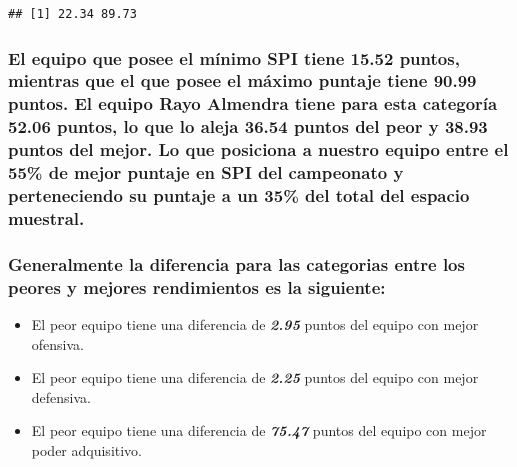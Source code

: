 \documentclass[]{article}
\begin{document}
\begin{verbatim}
## [1] 22.34 89.73
\end{verbatim}

\hypertarget{el-equipo-que-posee-el-minimo-spi-tiene-15.52-puntos-mientras-que-el-que-posee-el-maximo-puntaje-tiene-90.99-puntos.-el-equipo-rayo-almendra-tiene-para-esta-categoria-52.06-puntos-lo-que-lo-aleja-36.54-puntos-del-peor-y-38.93-puntos-del-mejor.-lo-que-posiciona-a-nuestro-equipo-entre-el-55-de-mejor-puntaje-en-spi-del-campeonato-y-perteneciendo-su-puntaje-a-un-35-del-total-del-espacio-muestral.}{%
\subsubsection{El equipo que posee el mínimo SPI tiene 15.52 puntos,
mientras que el que posee el máximo puntaje tiene 90.99 puntos. El
equipo Rayo Almendra tiene para esta categoría 52.06 puntos, lo que lo
aleja 36.54 puntos del peor y 38.93 puntos del mejor. Lo que posiciona a
nuestro equipo entre el 55\% de mejor puntaje en SPI del campeonato y
perteneciendo su puntaje a un 35\% del total del espacio
muestral.}\label{el-equipo-que-posee-el-minimo-spi-tiene-15.52-puntos-mientras-que-el-que-posee-el-maximo-puntaje-tiene-90.99-puntos.-el-equipo-rayo-almendra-tiene-para-esta-categoria-52.06-puntos-lo-que-lo-aleja-36.54-puntos-del-peor-y-38.93-puntos-del-mejor.-lo-que-posiciona-a-nuestro-equipo-entre-el-55-de-mejor-puntaje-en-spi-del-campeonato-y-perteneciendo-su-puntaje-a-un-35-del-total-del-espacio-muestral.}}

\hypertarget{generalmente-la-diferencia-para-las-categorias-entre-los-peores-y-mejores-rendimientos-es-la-siguiente}{%
\subsubsection{Generalmente la diferencia para las categorias entre los
peores y mejores rendimientos es la
siguiente:}\label{generalmente-la-diferencia-para-las-categorias-entre-los-peores-y-mejores-rendimientos-es-la-siguiente}}

\begin{itemize}
  \item El peor equipo tiene una diferencia de \textbf{\textit{2.95}} puntos del equipo con mejor ofensiva.
  \item El peor equipo tiene una diferencia de \textbf{\textit{2.25}} puntos del equipo con mejor defensiva.
  \item El peor equipo tiene una diferencia de \textbf{\textit{75.47}} puntos del equipo con mejor poder adquisitivo.
\end{itemize}
\end{document}
